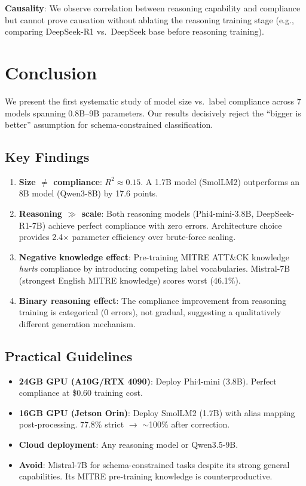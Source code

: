 \documentclass[review,3p]{elsarticle}
\begin{document}
\textbf{Causality}: We observe correlation between reasoning capability and compliance but cannot prove causation without ablating the reasoning training stage (e.g., comparing DeepSeek-R1 vs.\ DeepSeek base before reasoning training).

\section{Conclusion}

We present the first systematic study of model size vs.\ label compliance across 7 models spanning 0.8B--9B parameters. Our results decisively reject the ``bigger is better'' assumption for schema-constrained classification.

\subsection{Key Findings}
\begin{enumerate}
\item \textbf{Size $\neq$ compliance}: $R^2 \approx 0.15$. A 1.7B model (SmolLM2) outperforms an 8B model (Qwen3-8B) by 17.6 points.
\item \textbf{Reasoning $\gg$ scale}: Both reasoning models (Phi4-mini-3.8B, DeepSeek-R1-7B) achieve perfect compliance with zero errors. Architecture choice provides 2.4$\times$ parameter efficiency over brute-force scaling.
\item \textbf{Negative knowledge effect}: Pre-training MITRE ATT\&CK knowledge \emph{hurts} compliance by introducing competing label vocabularies. Mistral-7B (strongest English MITRE knowledge) scores worst (46.1\%).
\item \textbf{Binary reasoning effect}: The compliance improvement from reasoning training is categorical (0 errors), not gradual, suggesting a qualitatively different generation mechanism.
\end{enumerate}

\subsection{Practical Guidelines}
\begin{itemize}
\item \textbf{24GB GPU (A10G/RTX 4090)}: Deploy Phi4-mini (3.8B). Perfect compliance at \$0.60 training cost.
\item \textbf{16GB GPU (Jetson Orin)}: Deploy SmolLM2 (1.7B) with alias mapping post-processing. 77.8\% strict $\to$ $\sim$100\% after correction.
\item \textbf{Cloud deployment}: Any reasoning model or Qwen3.5-9B.
\item \textbf{Avoid}: Mistral-7B for schema-constrained tasks despite its strong general capabilities. Its MITRE pre-training knowledge is counterproductive.
\end{itemize}
\end{document}
